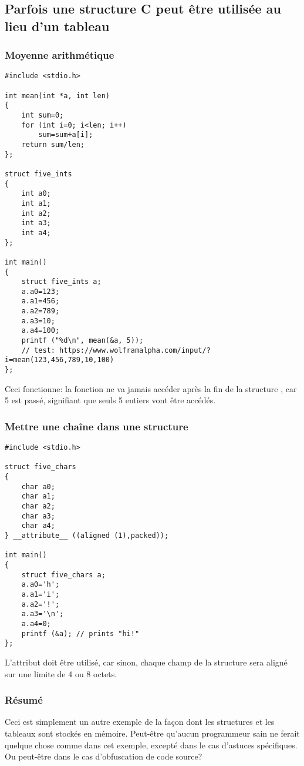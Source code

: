 \subsection{Parfois une structure C peut être utilisée au lieu d'un tableau}

\subsubsection{Moyenne arithmétique}

\begin{lstlisting}[style=customc]
#include <stdio.h>

int mean(int *a, int len)
{
	int sum=0;
	for (int i=0; i<len; i++)
		sum=sum+a[i];
	return sum/len;
};

struct five_ints
{
	int a0;
	int a1;
	int a2;
	int a3;
	int a4;
};

int main()
{
	struct five_ints a;
	a.a0=123;
	a.a1=456;
	a.a2=789;
	a.a3=10;
	a.a4=100;
	printf ("%d\n", mean(&a, 5));
	// test: https://www.wolframalpha.com/input/?i=mean(123,456,789,10,100)
};
\end{lstlisting}

Ceci fonctionne: la fonction  ne va jamais accéder après la fin de la
structure , car 5 est passé, signifiant que seuls 5 entiers vont être
accédés.

\subsubsection{Mettre une chaîne dans une structure}

\begin{lstlisting}[style=customc]
#include <stdio.h>

struct five_chars
{
	char a0;
	char a1;
	char a2;
	char a3;
	char a4;
} __attribute__ ((aligned (1),packed));

int main()
{
	struct five_chars a;
	a.a0='h';
	a.a1='i';
	a.a2='!';
	a.a3='\n';
	a.a4=0;
	printf (&a); // prints "hi!"
};
\end{lstlisting}

L'attribut  doit être utilisé, car sinon, chaque champ
de la structure sera aligné sur une limite de 4 ou 8 octets.

\subsubsection{Résumé}

Ceci est simplement un autre exemple de la façon dont les structures et les tableaux
sont stockés en mémoire.
Peut-être qu'aucun programmeur sain ne ferait quelque chose comme dans cet exemple,
excepté dans le cas d'astuces spécifiques.
Ou peut-être dans le cas d'obfuscation de code source?

